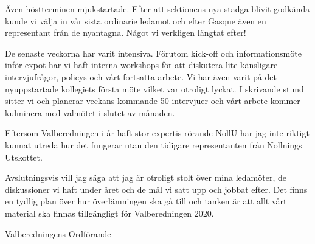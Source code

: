\documentclass[../_main/handlingar.tex]{subfiles}
\begin{document}
\vspace{8px}

Även höstterminen mjukstartade. Efter att sektionens nya stadga blivit godkända kunde vi välja in vår sista ordinarie ledamot och efter Gasque även en representant från de nyantagna. Något vi verkligen längtat efter!

De senaste veckorna har varit intensiva. Förutom kick-off och informationsmöte inför expot har vi haft interna workshops för att diskutera lite känsligare intervjufrågor, policys och vårt fortsatta arbete. Vi har även varit på det nyuppstartade kollegiets första möte vilket var otroligt lyckat. I skrivande stund sitter vi och planerar veckans kommande 50 intervjuer och vårt arbete kommer kulminera med valmötet i slutet av månaden.  

Eftersom Valberedningen i år haft stor expertis rörande NollU har jag inte riktigt kunnat utreda hur det fungerar utan den tidigare representanten från Nollnings Utskottet. 

Avslutningsvis vill jag säga att jag är otroligt stolt över mina ledamöter, de diskussioner vi haft under året och de mål vi satt upp och jobbat efter. Det finns en tydlig plan över hur överlämningen ska gå till och tanken är att allt vårt material ska finnas tillgängligt för Valberedningen 2020. 

\begin{signatures}{1}
    \mvh
    \signature{Axel Voss}{Valberedningens Ordförande}
\end{signatures}
\end{document}
